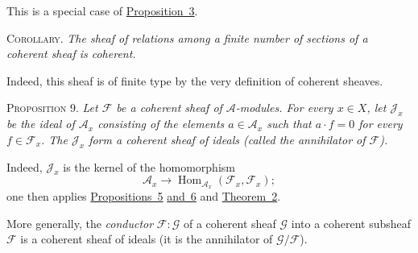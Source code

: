This is a special case of \hyperref[fac:I:2:no:12:prop:3]{Proposition~3}.

\label{fac:I:2:no:15:prop:8:cor}
\textsc{Corollary.} \textit{The sheaf of relations among a finite number of sections of a coherent sheaf is coherent.}

Indeed, this sheaf is of finite type by the very definition of coherent sheaves.

\label{fac:I:2:no:15:prop:9}
\textsc{Proposition 9.} \textit{Let $\mathcal{F}$ be a coherent sheaf of $\mathcal{A}$-modules. For every $x\in X$, let $\mathcal{J}_x$ be the ideal of $\mathcal{A}_x$ consisting of the elements $a\in\mathcal{A}_x$ such that $a\cdot f=0$ for every $f\in\mathcal{F}_x$. The $\mathcal{J}_x$ form a coherent sheaf of ideals (called the annihilator of $\mathcal{F}$).}

Indeed, $\mathcal{J}_x$ is the kernel of the homomorphism
\[
\mathcal{A}_x\longrightarrow
\operatorname{Hom}_{\mathcal{A}_x}(\mathcal{F}_x,\mathcal{F}_x);
\]
one then applies \hyperref[fac:I:2:no:14:prop:5]{Propositions~5} \hyperref[fac:I:2:no:14:prop:6]{and~6} and \hyperref[fac:I:2:no:13:thm:2]{Theorem~2}.

More generally, the \textit{conductor} $\mathcal{F}:\mathcal{G}$ of a coherent sheaf $\mathcal{G}$ into a coherent subsheaf $\mathcal{F}$ is a coherent sheaf of ideals (it is the annihilator of $\mathcal{G}/\mathcal{F}$).
